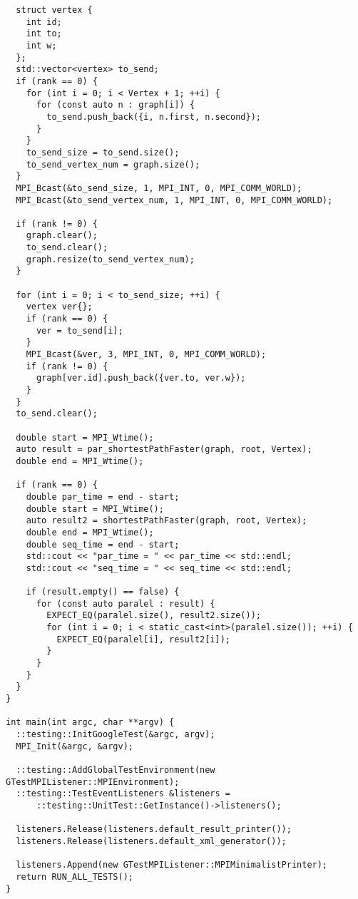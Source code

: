 \documentclass{report}
\begin{document}
\begin{lstlisting}
  struct vertex {
    int id;
    int to;
    int w;
  };
  std::vector<vertex> to_send;
  if (rank == 0) {
    for (int i = 0; i < Vertex + 1; ++i) {
      for (const auto n : graph[i]) {
        to_send.push_back({i, n.first, n.second});
      }
    }
    to_send_size = to_send.size();
    to_send_vertex_num = graph.size();
  }
  MPI_Bcast(&to_send_size, 1, MPI_INT, 0, MPI_COMM_WORLD);
  MPI_Bcast(&to_send_vertex_num, 1, MPI_INT, 0, MPI_COMM_WORLD);

  if (rank != 0) {
    graph.clear();
    to_send.clear();
    graph.resize(to_send_vertex_num);
  }

  for (int i = 0; i < to_send_size; ++i) {
    vertex ver{};
    if (rank == 0) {
      ver = to_send[i];
    }
    MPI_Bcast(&ver, 3, MPI_INT, 0, MPI_COMM_WORLD);
    if (rank != 0) {
      graph[ver.id].push_back({ver.to, ver.w});
    }
  }
  to_send.clear();

  double start = MPI_Wtime();
  auto result = par_shortestPathFaster(graph, root, Vertex);
  double end = MPI_Wtime();

  if (rank == 0) {
    double par_time = end - start;
    double start = MPI_Wtime();
    auto result2 = shortestPathFaster(graph, root, Vertex);
    double end = MPI_Wtime();
    double seq_time = end - start;
    std::cout << "par_time = " << par_time << std::endl;
    std::cout << "seq_time = " << seq_time << std::endl;

    if (result.empty() == false) {
      for (const auto paralel : result) {
        EXPECT_EQ(paralel.size(), result2.size());
        for (int i = 0; i < static_cast<int>(paralel.size()); ++i) {
          EXPECT_EQ(paralel[i], result2[i]);
        }
      }
    }
  }
}

int main(int argc, char **argv) {
  ::testing::InitGoogleTest(&argc, argv);
  MPI_Init(&argc, &argv);

  ::testing::AddGlobalTestEnvironment(new GTestMPIListener::MPIEnvironment);
  ::testing::TestEventListeners &listeners =
      ::testing::UnitTest::GetInstance()->listeners();

  listeners.Release(listeners.default_result_printer());
  listeners.Release(listeners.default_xml_generator());

  listeners.Append(new GTestMPIListener::MPIMinimalistPrinter);
  return RUN_ALL_TESTS();
}

\end{lstlisting}
\end{document}
